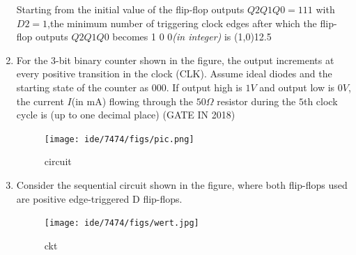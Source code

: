 \begin{enumerate}

Starting from the initial value of the flip-flop outputs $Q2Q1Q0 =111$ with $D2=1$,the minimum number of triggering clock edges after which the flip-flop outputs $Q2Q1Q0$ becomes 1 0 0\emph{(in integer)} is \line(1,0){12.5} 

\item  
\label{prob:gate IN 17}
For the $3$-bit binary counter shown in the figure, the output increments at every positive 
transition in the clock (CLK). Assume ideal diodes and the starting state of the counter as 
$000$. If output high is $1 V$ and output low is $0 V$, the current $I$(in mA) flowing through the 
$50 \Omega$ resistor during the $5$th clock cycle is (up to one decimal place)
\hfill(GATE IN 2018)
\begin{figure}[H]
\centering
\texttt{[image: ide/7474/figs/pic.png]}
\caption{circuit}
\label{fig:lcd}
\end{figure}
\item
\label{prob:gate CS 22}
Consider the sequential circuit shown in the figure, where both flip-flops used are positive
    edge-triggered D flip-flops.
\begin{figure}[H]
        \centering      
        \texttt{[image: ide/7474/figs/wert.jpg]}
        \caption{ckt}    
        \label{fig:wert}
    \end{figure}


\end{enumerate}
